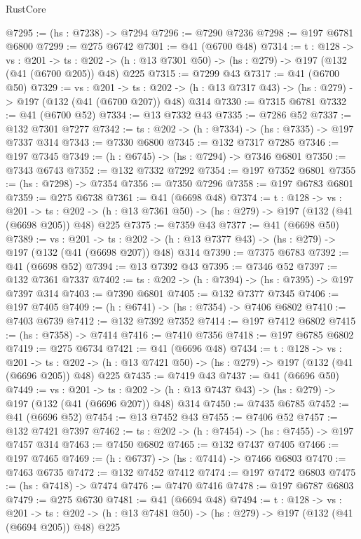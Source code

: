 \begin{lexlean}{RustCore}
\begin{coremodule}
@7295 := (hs : @7238) -> @7294
@7296 := @7290 @7236
@7298 := @197 @6781 @6800
@7299 := @275 @6742
@7301 := @41 (@6700 @48)
@7314 := {t : @128} ->
  {vs : @201} ->
  {ts : @202} -> (h : @13 @7301 @50) -> (hs : @279) -> @197 (@132 (@41 (@6700 @205)) @48) @225
@7315 := @7299 @43
@7317 := @41 (@6700 @50)
@7329 := {vs : @201} ->
  {ts : @202} -> (h : @13 @7317 @43) -> (hs : @279) -> @197 (@132 (@41 (@6700 @207)) @48) @314
@7330 := @7315 @6781
@7332 := @41 (@6700 @52)
@7334 := @13 @7332 @43
@7335 := @7286 @52
@7337 := @132 @7301 @7277
@7342 := {ts : @202} -> (h : @7334) -> (hs : @7335) -> @197 @7337 @314
@7343 := @7330 @6800
@7345 := @132 @7317 @7285
@7346 := @197 @7345
@7349 := (h : @6745) -> (hs : @7294) -> @7346 @6801
@7350 := @7343 @6743
@7352 := @132 @7332 @7292
@7354 := @197 @7352 @6801
@7355 := (hs : @7298) -> @7354
@7356 := @7350 @7296
@7358 := @197 @6783 @6801
@7359 := @275 @6738
@7361 := @41 (@6698 @48)
@7374 := {t : @128} ->
  {vs : @201} ->
  {ts : @202} -> (h : @13 @7361 @50) -> (hs : @279) -> @197 (@132 (@41 (@6698 @205)) @48) @225
@7375 := @7359 @43
@7377 := @41 (@6698 @50)
@7389 := {vs : @201} ->
  {ts : @202} -> (h : @13 @7377 @43) -> (hs : @279) -> @197 (@132 (@41 (@6698 @207)) @48) @314
@7390 := @7375 @6783
@7392 := @41 (@6698 @52)
@7394 := @13 @7392 @43
@7395 := @7346 @52
@7397 := @132 @7361 @7337
@7402 := {ts : @202} -> (h : @7394) -> (hs : @7395) -> @197 @7397 @314
@7403 := @7390 @6801
@7405 := @132 @7377 @7345
@7406 := @197 @7405
@7409 := (h : @6741) -> (hs : @7354) -> @7406 @6802
@7410 := @7403 @6739
@7412 := @132 @7392 @7352
@7414 := @197 @7412 @6802
@7415 := (hs : @7358) -> @7414
@7416 := @7410 @7356
@7418 := @197 @6785 @6802
@7419 := @275 @6734
@7421 := @41 (@6696 @48)
@7434 := {t : @128} ->
  {vs : @201} ->
  {ts : @202} -> (h : @13 @7421 @50) -> (hs : @279) -> @197 (@132 (@41 (@6696 @205)) @48) @225
@7435 := @7419 @43
@7437 := @41 (@6696 @50)
@7449 := {vs : @201} ->
  {ts : @202} -> (h : @13 @7437 @43) -> (hs : @279) -> @197 (@132 (@41 (@6696 @207)) @48) @314
@7450 := @7435 @6785
@7452 := @41 (@6696 @52)
@7454 := @13 @7452 @43
@7455 := @7406 @52
@7457 := @132 @7421 @7397
@7462 := {ts : @202} -> (h : @7454) -> (hs : @7455) -> @197 @7457 @314
@7463 := @7450 @6802
@7465 := @132 @7437 @7405
@7466 := @197 @7465
@7469 := (h : @6737) -> (hs : @7414) -> @7466 @6803
@7470 := @7463 @6735
@7472 := @132 @7452 @7412
@7474 := @197 @7472 @6803
@7475 := (hs : @7418) -> @7474
@7476 := @7470 @7416
@7478 := @197 @6787 @6803
@7479 := @275 @6730
@7481 := @41 (@6694 @48)
@7494 := {t : @128} ->
  {vs : @201} ->
  {ts : @202} -> (h : @13 @7481 @50) -> (hs : @279) -> @197 (@132 (@41 (@6694 @205)) @48) @225

\end{coremodule}
\end{lexlean}
